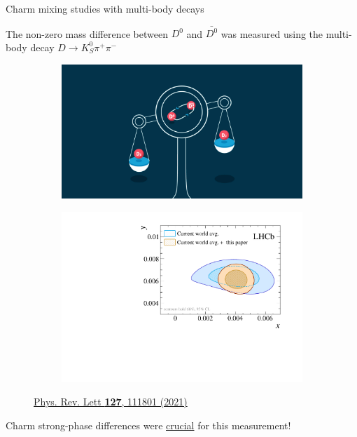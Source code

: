 \documentclass[xcolor={dvipsnames}]{beamer}
\begin{document}
\begin{frame}{Charm mixing studies with multi-body decays}
  \begin{center}
    \Large The non-zero mass difference between $D^0$ and $\bar{D^0}$ was measured using the multi-body decay $D\to K_S^0\pi^+\pi^-$
  \end{center}
  \vspace{-0.2cm}
  \begin{figure}[htb]
    \centering
    \begin{subfigure}{0.5\textwidth}
      \vspace{-0.2cm}
      \includegraphics[width=1.0\textwidth]{Plots/CharmMassDifferenceIllustration.jpg}
    \end{subfigure}%
    \begin{subfigure}{0.5\textwidth}
      \includegraphics[width=1.0\textwidth]{Plots/KSpipi_xy_observation.pdf}
    \end{subfigure}
    \vspace{-0.5cm}
    \caption*{\tiny\href{https://journals.aps.org/prl/abstract/10.1103/PhysRevLett.127.111801}{Phys. Rev. Lett \textbf{127}, 111801 (2021)}}
  \end{figure}
  \vspace{-0.5cm}
  \begin{center}
    {\large Charm strong-phase differences were \underline{crucial} for this measurement!}
  \end{center}
\end{frame}
\end{document}
